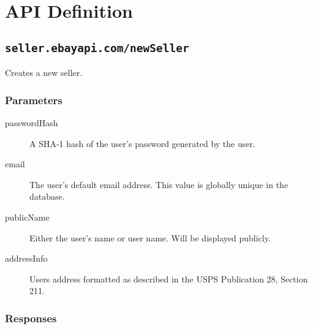 \documentclass{article}
\newcommand{\code}[1]{\colorbox{light-gray}{\texttt{#1}}}
\begin{document}

\section{API Definition}

\subsection{\code{seller.ebayapi.com/newSeller}}

Creates a new seller.

\subsubsection{Parameters}

\begin{description}
    \item[passwordHash] A SHA-1 hash of the user's password generated by the user.
    \item[email] The user's default email address. This value is globally unique in the database.
    \item[publicName] Either the user's name or user name. Will be displayed publicly.
    \item[addressInfo] Users address formatted as described in the USPS Publication 28, Section 211.
\end{description}

% 

\subsubsection{Responses}
\end{document}

